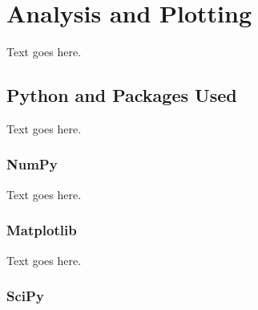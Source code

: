 
%
%

\section{Analysis and Plotting}
\label{sec:analysis}



Text goes here.




\subsection{Python and Packages Used}
\label{subsec:analysis--python}


Text goes here.



\subsubsection{NumPy}
\label{subsubsec:analysis--python--numpy}


Text goes here.



\subsubsection{Matplotlib}
\label{subsubsec:analysis--python--matplotlib}


Text goes here.



\subsubsection{SciPy}
\label{subsubsec:analysis--python--scipy}


